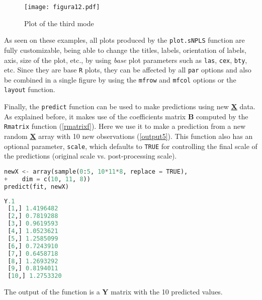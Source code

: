 \begin{figure}[!ht]
	\centering
\texttt{[image: figura12.pdf]}
\caption{Plot of the third mode}
\label{figura12}
\end{figure}
\vspace{10pt}

As seen on these examples, all plots produced by the \texttt{plot.sNPLS} function are fully customizable, being able to change the titles, labels, orientation of labels, axis, size of the plot, etc., by using \textit{base} plot parameters such as \texttt{las}, \texttt{cex}, \texttt{bty}, etc. Since they are base \texttt{R} plots, they can be affected by all \texttt{par} options and also be combined in a single figure by using the \texttt{mfrow} and \texttt{mfcol} options or the \texttt{layout} function.

Finally, the \texttt{predict} function can be used to make predictions using new \textbf{\underline{X}} data. As explained before, it makes use of the coefficients matrix \textbf{B} computed by the \texttt{Rmatrix} function (\autoref{rmatrixf}). Here we use it to make a prediction from a new random \textbf{\underline{X}} array with 10 new observations (\autoref{output5}). This function also has an optional parameter, \texttt{scale}, which defaults to \texttt{TRUE} for controlling the final scale of the predictions (original scale vs. post-processing scale).

\vspace{15pt}
\begin{lstlisting}[basicstyle=\small, language=Python, morekeywords={array, sample, predict}]
newX <- array(sample(0:5, 10*11*8, replace = TRUE), 
+    dim = c(10, 11, 8))
predict(fit, newX)
\end{lstlisting}
\vspace{15pt}
\begin{lstlisting}[basicstyle=\small, backgroundcolor=\color{output}, numbers=none, label={output5}, language=Python, caption=Predictions of the model on new data \texttt{newX}.]
            Y.1
 [1,] 1.4196482
 [2,] 0.7819288
 [3,] 0.9619593
 [4,] 1.0523621
 [5,] 1.2585099
 [6,] 0.7243910
 [7,] 0.6458718
 [8,] 1.2693292
 [9,] 0.8194011
 [10,] 1.2753320
\end{lstlisting}

The output of the function is a \textbf{Y} matrix with the 10 predicted values.

